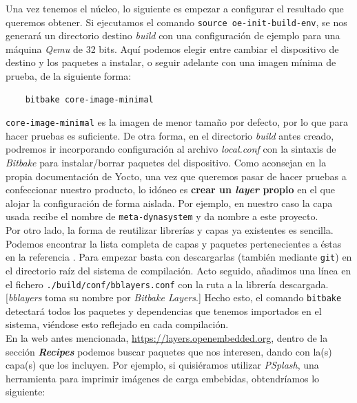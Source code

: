 Una vez tenemos el núcleo, lo siguiente es empezar a configurar el resultado que queremos obtener. Si ejecutamos el comando \texttt{source oe-init-build-env}, se nos generará un directorio destino \textit{build} con una configuración de ejemplo para una máquina \textit{Qemu} de 32 bits. Aquí podemos elegir entre cambiar el dispositivo de destino y los paquetes a instalar, o seguir adelante con una imagen mínima de prueba, de la siguiente forma:

\begin{center}
	\begin{lstlisting}
	bitbake core-image-minimal
	\end{lstlisting}
\end{center}

\texttt{core-image-minimal} es la imagen de menor tamaño por defecto, por lo que para hacer pruebas es suficiente. De otra forma, en el directorio \textit{build} antes creado, podremos ir incorporando configuración al archivo \textit{local.conf} con la sintaxis de \textit{Bitbake} para instalar/borrar paquetes del dispositivo. Como aconsejan en la propia documentación de Yocto, una vez que queremos pasar de hacer pruebas a confeccionar nuestro producto, lo idóneo es \textbf{crear un \textit{layer} propio} en el que alojar la configuración de forma aislada. Por ejemplo, en nuestro caso la capa usada recibe el nombre de \texttt{meta-dynasystem} y da nombre a este proyecto.\\

Por otro lado, la forma de reutilizar librerías y capas ya existentes es sencilla. Podemos encontrar la lista completa de capas y paquetes pertenecientes a éstas en la referencia \cite{yocto-layers-list}. Para empezar basta con descargarlas (también mediante \texttt{git}) en el directorio raíz del sistema de compilación. Acto seguido, añadimos una línea en el fichero \texttt{./build/conf/bblayers.conf} con la ruta a la librería descargada. [\textit{bblayers} toma su nombre por \textit{Bitbake Layers}.] Hecho esto, el comando \texttt{bitbake} detectará todos los paquetes y dependencias que tenemos importados en el sistema, viéndose esto reflejado en cada compilación.\\

En la web antes mencionada, \url{https://layers.openembedded.org}, dentro de la sección \textbf{\textit{Recipes}} podemos buscar paquetes que nos interesen, dando con la(s) capa(s) que los incluyen. Por ejemplo, si quisiéramos utilizar \textit{PSplash}, una herramienta para imprimir imágenes de carga embebidas, obtendríamos lo siguiente:

